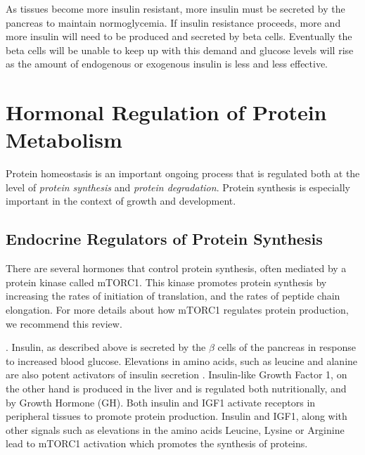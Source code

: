\documentclass{tufte-handout}
\begin{document}
As tissues become more insulin resistant, more insulin must be secreted by the pancreas to maintain normoglycemia.  If insulin resistance proceeds, more and more insulin will need to be produced and secreted by beta cells.  Eventually the beta cells will be unable to keep up with this demand and glucose levels will rise as the amount of endogenous or exogenous insulin is less and less effective.

\section{Hormonal Regulation of Protein Metabolism}
Protein homeostasis is an important ongoing process that is regulated both at the level of \emph{protein synthesis} and \emph{protein degradation}.  Protein synthesis is especially important in the context of growth and development.  

\subsection{Endocrine Regulators of Protein Synthesis}

There are several hormones that control protein synthesis, often mediated by a protein kinase called mTORC1.   This kinase promotes protein synthesis by increasing the rates of initiation of translation, and the rates of peptide chain elongation.  For more details about how mTORC1 regulates protein production, we recommend this review\citep{Gingras2004}.

.  Insulin, as described above is secreted by the $\beta$ cells of the pancreas in response to increased blood glucose.  Elevations in amino acids, such as leucine and alanine are also potent activators of insulin secretion \citep{Floyd1966}.  Insulin-like Growth Factor 1, on the other hand is produced in the liver and is regulated both nutritionally, and by Growth Hormone (GH).  Both insulin and IGF1 activate receptors in peripheral tissues to promote protein production.   Insulin and IGF1, along with other signals such as elevations in the amino acids Leucine, Lysine or Arginine lead to mTORC1 activation which promotes the synthesis of proteins.
\end{document}
